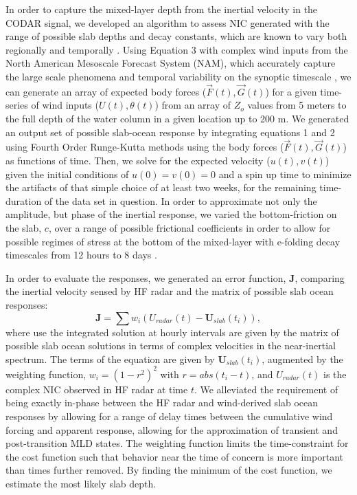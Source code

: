 \documentclass{article}
\begin{document}
In order to capture the mixed-layer depth from the inertial velocity in the CODAR signal, we developed an algorithm to assess NIC generated with the range of possible slab depths and decay constants, which are known to vary both regionally and temporally \cite{DAsaro1989,MacKinnon2005,Chant2001,Zhang2014,Park2009}.
Using Equation 3 with complex wind inputs from the North American Mesoscale Forecast System (NAM), which accurately capture the large scale phenomena and temporal variability on the synoptic timescale \cite{Rife2005}, we can generate an array of expected body forces ($\overrightarrow{F}(t),\overrightarrow{G}(t)$) for a given time-series of wind inputs ($U(t),\theta(t)$) from an array of $Z_o$ values from 5 meters to the full depth of the water column in a given location up to 200 m.
We generated an output set of possible slab-ocean response by integrating equations 1 and 2 using Fourth Order Runge-Kutta methods using the body forces ($\overrightarrow{F}(t),\overrightarrow{G}(t)$) as functions of time.
Then, we solve for the expected velocity ($u(t),v(t)$) given the initial conditions of $u(0)=v(0)=0$ and a spin up time to minimize the artifacts of that simple choice of at least two weeks, for the remaining time-duration of the data set in question.
In order to approximate not only the amplitude, but phase of the inertial response, we varied the bottom-friction on the slab, $c$, over a range of possible frictional coefficients in order to allow for possible regimes of stress at the bottom of the mixed-layer with e-folding decay timescales from 12 hours to 8 days \cite{Shearman2005,Park2009}.

In order to evaluate the responses, we generated an error function, $\mathbf{J}$, comparing the inertial velocity sensed by HF radar and the matrix of possible slab ocean responses:
\begin{equation}
    \mathbf{J} = \sum w_i(U_{radar}(t) - \mathbf{U}_{slab}(t_i)),
\end{equation}
where use the integrated solution at hourly intervals are given by the matrix of possible slab ocean solutions in terms of complex velocities in the near-inertial spectrum.
The terms of the equation are given by $\mathbf{U}_{slab}(t_i)$, augmented by the weighting function, $w_i = {(1-r^2)}^2$ with $r = abs(t_i - {t})$, and $U_{radar}({t})$ is the complex NIC observed in HF radar at time $t$.
We alleviated the requirement of being exactly in-phase between the HF radar and wind-derived slab ocean responses by allowing for a range of delay times between the cumulative wind forcing and apparent response, allowing for the approximation of transient and post-transition MLD states.
The weighting function limits the time-constraint for the cost function such that behavior near the time of concern is more important than times further removed. 
By finding the minimum of the cost function, we estimate the most likely slab depth. 
\end{document}
